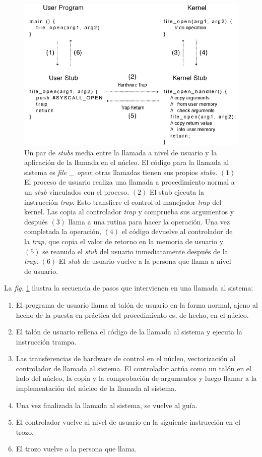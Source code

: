 \documentclass[10pt]{book}
\begin{document}
\begin{figure}[tbhp]
\centerline{\includegraphics[scale=0.45]{img/fig0209}}
\caption{Un par de \textit{stubs} media entre la llamada a nivel de usuario y la aplicación de la llamada en el núcleo. El código para la llamada al sistema es \textit{file \_ open}; otras llamadas tienen sus propios \textit{stubs}. $(1)$ El proceso de usuario realiza una llamada a procedimiento normal a un \textit{stub} vinculados con el proceso. $(2)$ El stub ejecuta la instrucción \textit{trap}. Esto transfiere el control al manejador \textit{trap} del kernel. Las copia al controlador \textit{trap} y comprueba sus argumentos y después $(3)$ llama a una rutina para hacer la operación. Una vez completada la operación, $(4)$ el código devuelve al controlador de la \textit{trap}, que copia el valor de retorno en la memoria de usuario y $(5)$ se reanuda el \textit{stub} del usuario inmediatamente después de la \textit{trap}. $(6)$ El \textit{stub} de usuario vuelve a la persona que llama a nivel de usuario.}
\label{fig0209}
\end{figure}

La \textit{fig.} \ref{fig0209} ilustra la secuencia de pasos que intervienen en una llamada al sistema:
\begin{enumerate}
\item El programa de usuario llama al talón de usuario en la forma normal, ajeno al hecho de la puesta en práctica del procedimiento es, de hecho, en el núcleo.
\item El talón de usuario rellena el código de la llamada al sistema y ejecuta la instrucción trampa.
\item Las transferencias de hardware de control en el núcleo, vectorización al controlador de llamada al sistema. El controlador actúa como un talón en el lado del núcleo, la copia y la comprobación de argumentos y luego llamar a la implementación del núcleo de la llamada al sistema.
\item Una vez finalizada la llamada al sistema, se vuelve al guía.
\item El controlador vuelve al nivel de usuario en la siguiente instrucción en el trozo.
\item El trozo vuelve a la persona que llama.
\end{enumerate}
\end{document}
